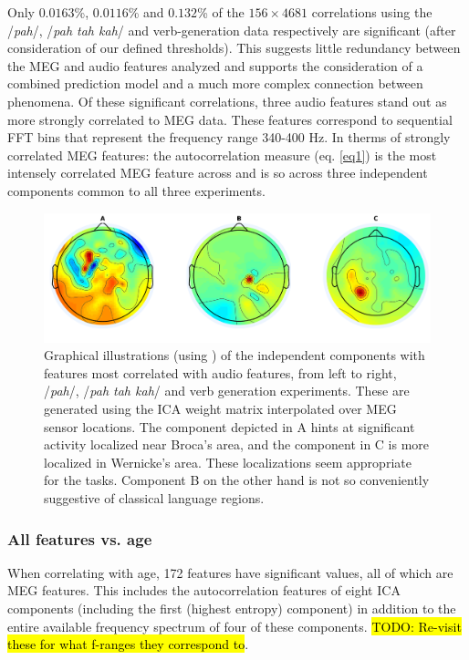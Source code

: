 \documentclass[utf8]{frontiersSCNS} %
\begin{document}
Only $0.0163$\%, $0.0116$\% and $0.132$\% of the $156 \times 4681$ correlations using the /{\em pah}/, /{\em pah tah kah}/ and verb-generation data respectively are significant (after consideration of our defined thresholds). This suggests little redundancy between the MEG and audio features analyzed and supports the consideration of a combined prediction model and a much more complex connection between phenomena. Of these significant correlations, three audio features stand out as more strongly correlated to MEG data. These features correspond to sequential FFT bins that represent the frequency range 340-400 Hz. In therms of strongly correlated MEG features: the autocorrelation measure (eq. \ref{eq1}) is the most intensely correlated MEG feature across and is so across three independent components common to all three experiments.

\begin{figure}[t]
  \centering
  \includegraphics[width=\linewidth]{AllComponents.png}
  \caption{Graphical illustrations (using \cite{Delorme04eeglab}) of the independent components with features most correlated with audio features, from left to right, /{\em pah}/, /{\em pah tah kah}/ and verb generation experiments. These are generated using the ICA weight matrix interpolated over MEG sensor locations. The component depicted in A hints at significant activity localized near Broca's area, and the component in C is more localized in Wernicke's area. These localizations seem appropriate for the tasks. Component B on the other hand is not so conveniently suggestive of classical language regions.}
  \label{fig:components}
\end{figure}
 
\subsubsection{All features vs. age}

When correlating with age, 172 features have significant values, all of which are MEG features. This includes the autocorrelation features of eight ICA components (including the first (highest entropy) component) in addition to the entire available frequency spectrum of four of these components. \hl{TODO: Re-visit these for what f-ranges they correspond to}.
\end{document}
